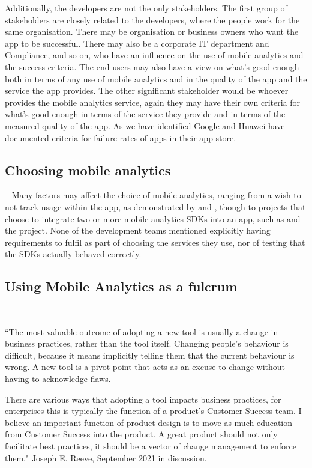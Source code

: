 Additionally, the developers are not the only stakeholders. 
The first group of stakeholders are closely related to the developers, where the people work for the same organisation. There may be organisation or business owners who want the app to be successful. There may also be a corporate IT department and Compliance, and so on, who have an influence on the use of mobile analytics and the success criteria. 
The end-users may also have a view on what's good enough both in terms of any use of mobile analytics and in the quality of the app and the service the app provides. 
The other significant stakeholder would be whoever provides the mobile analytics service, again they may have their own criteria for what's good enough in terms of the service they provide and in terms of the measured quality of the app. As we have identified Google and Huawei have documented criteria for failure rates of apps in their app store.

\subsection{Choosing mobile analytics}~\label{discussion-choosing-mobile-analytics-topic}
Many factors may affect the choice of mobile analytics, ranging from a wish to not track usage within the app, as demonstrated by  and , though to projects that choose to integrate two or more mobile analytics SDKs into an app, such as  and the  project. None of the development teams mentioned explicitly having requirements to fulfil as part of choosing the services they use, nor of testing that the SDKs actually behaved correctly.  

\afterpage{\clearpage}
\subsection{Using Mobile Analytics as a fulcrum}~\label{discussion-using-mobile-analytics-as-a-fulcrum}
\begin{kaobox}[frametitle="On changing behaviour"]
``The most valuable outcome of adopting a new tool is usually a change in business practices, rather than the tool itself.
Changing people’s behaviour is difficult, because it means implicitly telling them that the current behaviour is wrong. A new tool is a pivot point that acts as an excuse to change without having to acknowledge flaws.

There are various ways that adopting a tool impacts business practices, for enterprises this is typically the function of a product’s Customer Success team. I believe an important function of product design is to move as much education from Customer Success into the product. A great product should not only facilitate best practices, it should be a vector of change management to enforce them." Joseph E. Reeve,  September 2021 in discussion.
\end{kaobox}

